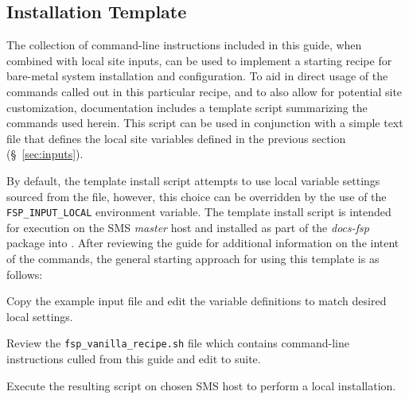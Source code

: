 \subsection{Installation Template}
The collection of command-line instructions included in this guide, when
combined with local site inputs, can be used to implement a starting recipe for
bare-metal system installation and configuration. To aid in direct usage of the
commands called out in this particular recipe, and to also allow for potential
site customization, \FSP{} documentation includes a template script summarizing
the commands used herein. This script can be used in conjunction with a simple
text file that defines the local site variables defined in the previous section
(\S~\ref{sec:inputs}).

By default, the template install script attempts to use local variable settings sourced
from the  file, however, this choice can be
overridden by the use of the \texttt{FSP\_INPUT\_LOCAL} environment
variable. The template install script is intended for execution on the SMS {\em
  master} host and installed as part of the {\em docs-fsp} package into
.  After reviewing the guide
for additional information on the intent of the commands, the general starting
approach for using this template is as follows:

\begin{itemize*}
\item Copy the  example input file and edit the
  variable definitions to match desired local settings.
\item Review the \texttt{fsp\_vanilla\_recipe.sh} file which contains
  command-line instructions culled from this guide and edit to suite.
\item Execute the resulting script on chosen SMS host to perform a local installation.
\end{itemize*}



